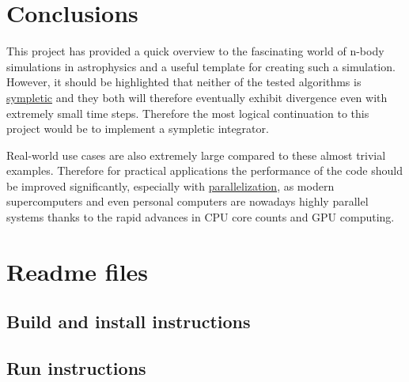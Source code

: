 \documentclass[a4paper]{article}
\begin{document}
\FloatBarrier
\section{Conclusions}
This project has provided a quick overview to the fascinating world of n-body simulations in astrophysics and a useful template for creating such a simulation.
However, it should be highlighted that neither of the tested algorithms is
\href{https://en.wikipedia.org/wiki/Symplectic_integrator}{sympletic}
and they both will therefore eventually exhibit divergence even with extremely small time steps.
Therefore the most logical continuation to this project would be to implement a sympletic integrator.

Real-world use cases are also extremely large compared to these almost trivial examples.
Therefore for practical applications the performance of the code should be improved significantly, especially with
\href{https://gitlab.com/AgenttiX/tie-51257-project}{parallelization}, as modern supercomputers and even personal computers are nowadays highly parallel systems thanks to the rapid advances in CPU core counts and GPU computing.


\clearpage
\printbibliography

\clearpage
\appendix
\section{Readme files}
\label{readmes}
\subsection{Build and install instructions}

\clearpage
\subsection{Run instructions}
\end{document}
